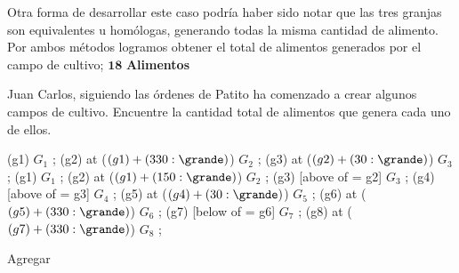 \noindent Otra forma de desarrollar este caso podría haber sido notar que las tres granjas son equivalentes u homólogas, generando todas la misma cantidad de alimento. Por ambos %
métodos logramos obtener el total de alimentos generados por el campo de cultivo; $\mathbf{18}$ \textbf{Alimentos}


\begin{probgrupal}{}{}{}

\noindent Juan Carlos, siguiendo las órdenes de Patito ha comenzado a crear algunos campos de cultivo. Encuentre la cantidad total de alimentos que genera cada uno de ellos.

\begin{center}
\cultivos
\granja (g1) {$G_1$} ;
\granja (g2) at ($(g1) + (330:\grande)$) {$G_2$} ;
\granja (g3) at ($(g2) + (30:\grande)$) {$G_3$} ;
\finfin
\hspace{30mm}
\cultivos
\granja (g1) {$G_1$} ;
\granja (g2) at ($(g1) + (150:\grande)$) {$G_2$} ;
\granja (g3) [above of = g2] {$G_3$} ;
\granja (g4) [above of = g3] {$G_4$} ;
\granja (g5) at ($(g4) + (30:\grande)$) {$G_5$} ;
\granja (g6) at ($(g5) + (330:\grande)$) {$G_6$} ;
\granja (g7) [below of = g6] {$G_7$} ;
\granja (g8) at ($(g7) + (330:\grande)$) {$G_8$} ;
\finfin
\end{center}

\end{probgrupal}

\begin{solgrupal}
\noindent Agregar
\end{solgrupal}


